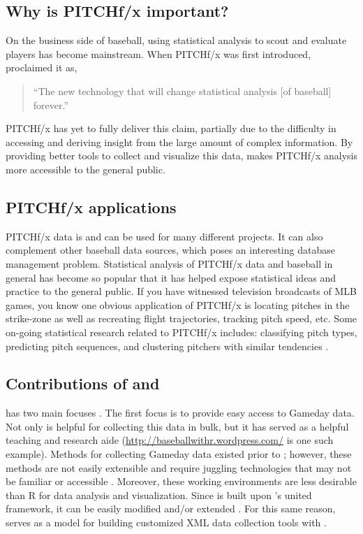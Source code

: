 \begin{article}
\subsection{Why is PITCHf/x important?}

On the business side of baseball, using statistical analysis to scout
and evaluate players has become mainstream. When PITCHf/x was first
introduced, \citep{slate} proclaimed it as, \begin{quote} ``The new technology that will change statistical analysis [of baseball] forever.'' \end{quote}
PITCHf/x has yet to fully deliver this claim, partially due to the
difficulty in accessing and deriving insight from the large amount
of complex information. By providing better tools to collect and visualize
this data,  makes PITCHf/x analysis more accessible
to the general public.


\subsection{PITCHf/x applications}

PITCHf/x data is and can be used for many different projects. It can
also complement other baseball data sources, which poses an interesting
database management problem. Statistical analysis of PITCHf/x data
and baseball in general has become so popular that it has helped expose
statistical ideas and practice to the general public. If you have
witnessed television broadcasts of MLB games, you know one obvious
application of PITCHf/x is locating pitches in the strike-zone as
well as recreating flight trajectories, tracking pitch speed, etc.
Some on-going statistical research related to PITCHf/x includes: classifying
pitch types, predicting pitch sequences, and clustering pitchers with
similar tendencies \citep{curve}.


\subsection[Contributions of pitchRx and XML2R]{Contributions of  and }

 has two main focuses \citep{pitchRx}. The first focus
is to provide easy access to Gameday data. Not only is 
helpful for collecting this data in bulk, but it has served as a helpful
teaching and research aide (\url{http://baseballwithr.wordpress.com/}
is one such example). Methods for collecting Gameday data existed
prior to ; however, these methods are not easily extensible
and require juggling technologies that may not be familiar or accessible
\citep{database}. Moreover, these working environments are less desirable
than R for data analysis and visualization. Since  is
built upon 's united framework, it can be easily modified
and/or extended \citep{XML2R}. For this same reason, 
serves as a model for building customized XML data collection tools
with .


\end{article}
